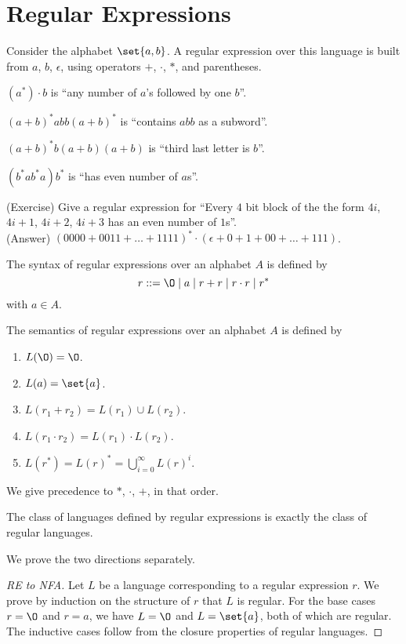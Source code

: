 \section{Regular Expressions} \label{sec:regex}
Consider the alphabet $\set{a, b}$.
A regular expression over this language is built from $a$, $b$, $\epsilon$,
using operators $+$, $\cdot$, $*$, and parentheses.
\begin{examples}
    \item $(a^*)\cdot b$ is ``any number of $a$'s followed by one $b$''.
    \item $(a + b)^*abb(a + b)^*$ is ``contains $abb$ as a subword''.
    \item $(a+b)^*b(a+b)(a+b)$ is ``third last letter is $b$''.
    \item $(b^*ab^*a)b^*$ is ``has even number of $a$s''.
    \item (Exercise) Give a regular expression for ``Every $4$ bit block of
    the the form $4i$, $4i+1$, $4i+2$, $4i+3$ has an even number of $1$s''.
    \\
    (Answer) $(0000 + 0011 + \dots + 1111)^*\cdot(\epsilon + 0 + 1 + 00 + \dots + 111)$.
\end{examples}

\begin{definition*} \label{def:regex}
    The syntax of regular expressions over an alphabet $A$ is defined by \[
        r ::= \O \mid a \mid r + r \mid r \cdot r \mid r^*
    \] with $a \in A$.

    The semantics of regular expressions over an alphabet $A$ is defined by
    \begin{enumerate}
        \item $L(\O) = \O$.
        \item $L(a) = \set{a}$.
        \item $L(r_1 + r_2) = L(r_1) \cup L(r_2)$.
        \item $L(r_1 \cdot r_2) = L(r_1) \cdot L(r_2)$.
        \item $L(r^*) = L(r)^* = \bigcup_{i = 0}^\infty L(r)^i$.
    \end{enumerate}
    We give precedence to $*$, $\cdot$, $+$, in that order.
\end{definition*}

\begin{theorem*} \label{thm:regex:kleene}
    The class of languages defined by regular expressions is exactly the
    class of regular languages.
\end{theorem*}
We prove the two directions separately.
\begin{proof}[RE to NFA]
    Let $L$ be a language corresponding to a regular expression $r$.
    We prove by induction on the structure of $r$ that $L$ is regular.
    For the base cases $r = \O$ and $r = a$, we have $L = \O$ and
    $L = \set{a}$, both of which are regular.
    The inductive cases follow from the closure properties of regular
    languages.
\end{proof}
